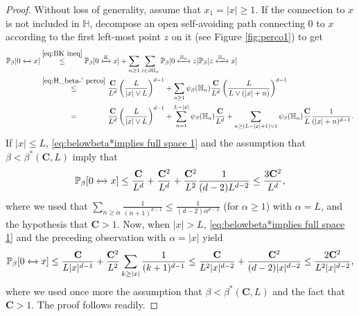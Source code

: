 \documentclass[11pt,a4paper]{article}
\numberwithin{equation}{section}
\theoremstyle{plain}
\theoremstyle{definition}
\newcommand\bfC{\mathbf{C}}
\newcommand{\connect}{\xleftrightarrow}
\begin{document}
\begin{proof} Without loss of generality, assume that $x_1=|x|\geq 1$.
If the connection to $x$ is not included in $\mathbb H$, decompose an open self-avoiding path connecting $0$ to $x$ according to the first left-most point $z$ on it (see Figure \ref{fig:perco1}) to get
\begin{align}
    \mathbb P_{\beta}[0\connect{}x]& \stackrel{\eqref{eq:BK ineq}}\le \mathbb P_{\beta}[0\connect{\mathbb H\:}x]+\sum_{n\ge 1}\sum_{\substack{z\in \partial\mathbb H_{n}}}\mathbb P_{\beta}[0\connect{\mathbb H_n\:}z] \mathbb P_{\beta}[z\connect{\mathbb H_n\:}x]\notag\\
    &\stackrel{\eqref{eq:H_beta-' perco}}\le \frac{\bfC}{L^d}\left(\frac{L}{|x|\vee L}\right)^{d-1}+ \sum_{n\ge 1}\psi_\beta(\mathbb H_n)\frac{\bfC}{L^d}\left(\frac{L}{L\vee (|x|+n)}\right)^{d-1}\notag
    \\&\stackrel{\phantom{\eqref{eq:H_beta-' perco}}}= \frac{\bfC}{L^d}\left(\frac{L}{|x|\vee L}\right)^{d-1}+\sum_{n=1}^{L-|x|}\psi_\beta(\mathbb H_n)\frac{\bfC}{L^d}+\sum_{n\geq (L-|x|+1)\vee 1}\psi_\beta(\mathbb H_n)\frac{\bfC}{L}\frac{1}{(|x|+n)^{d-1}}.\label{eq:belowbeta*implies full space 1}
\end{align}
If $|x|\leq L$, \eqref{eq:belowbeta*implies full space 1} and the assumption that $\beta< \beta^*(\bfC,L)$ imply that
\begin{equation}
	\mathbb P_\beta[0\connect{}x]\leq \frac{\bfC}{L^d}+\frac{\bfC^2}{L^d}+\frac{\bfC^2}{L^2}\frac{1}{(d-2)L^{d-2}}\leq \frac{3\bfC^2}{L^d},
\end{equation}
    where we used that $\sum_{n\geq \alpha}\tfrac{1}{(n+1)^{d-1}}\leq \tfrac{1}{(d-2)\alpha^{d-2}}$ (for $\alpha\geq 1$) with $\alpha=L$, and the hypothesis that $\bfC>1$. Now, when $|x|>L$, \eqref{eq:belowbeta*implies full space 1} and the preceding observation with $\alpha=|x|$ yield
    \begin{equation}
    	\mathbb P_\beta[0\connect{}x]\leq \frac{\bfC}{L|x|^{d-1}}+\frac{\bfC^2}{L^2}\sum_{k\geq |x|}\frac{1}{(k+1)^{d-1}}\leq \frac{\bfC}{L^2|x|^{d-2}}+\frac{\bfC^2}{(d-2)|x|^{d-2}}\leq \frac{2\bfC^2}{L^2|x|^{d-2}},
    \end{equation}
    where we used once more the assumption that $\beta< \beta^*(\bfC,L)$ and the fact that $\bfC>1$.
    The proof follows readily.	
\end{proof}
\end{document}
